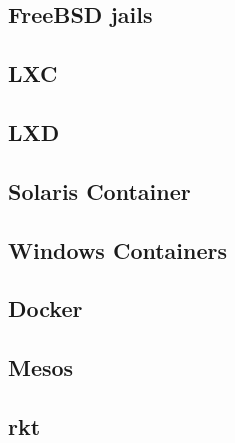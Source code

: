 \subsection{FreeBSD jails}
\label{sec:jails}



\subsection{LXC}
\label{sec:lxc}





\subsection{LXD}
\label{sec:lxd}


\subsection{Solaris Container}
\label{sec:solariscontainer}


\subsection{Windows Containers}
\label{sec:WindowsContainers}

\subsection{Docker}
\label{sec:Docker}

\subsection{Mesos}
\label{sec:Mesos}

\subsection{rkt}
\label{sec:rkt}
